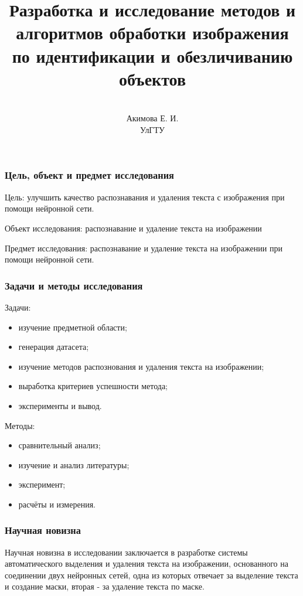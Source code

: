 \documentclass[
	fullscreen=true, 
	bookmarks=false,
	sans serif,
	9pt,
	pdf,
	hyperref={
		pdfpagelabels=false,
		unicode=true
	}
]{beamer}
\title{
	Разработка и исследование методов и алгоритмов обработки изображения по идентификации и обезличиванию объектов
}
\author{
	\vspace{0.5cm}\\
	\large
    Акимова Е. И.\\
	\vspace{0.1cm}
	УлГТУ\\
	\vspace{2cm}
}
\institute{}
\begin{document}
	
	\begin{frame}
		\titlepage
	\end{frame}	
		
	\section{}
	\subsection{}
		
	\begin{frame}\frametitle{Цель, объект и предмет исследования}
		Цель: улучшить качество распознавания и удаления текста с изображения при помощи нейронной сети.
		\newline
		
		Объект исследования: распознавание и удаление текста на изображении
		\newline
		
		Предмет исследования: распознавание и удаление текста на изображении при помощи нейронной сети.
	\end{frame}

	\begin{frame}\frametitle{Задачи и методы исследования}
		Задачи:
		\begin{itemize}
			\item изучение предметной области;
			\item генерация датасета;
			\item изучение методов распознования и удаления текста на изображении;
			\item выработка критериев успешности метода;
			\item эксперименты и вывод.
		\end{itemize}
		Методы:
		\begin{itemize}
			\item сравнительный анализ;
			\item изучение и анализ литературы;
			\item эксперимент;
			\item расчёты и измерения.
		\end{itemize}
	\end{frame}

	\begin{frame}\frametitle{Научная новизна}
		Научная новизна в исследовании заключается в разработке системы автоматического выделения и удаления текста на изображении, основанного на соединении двух нейронных сетей, одна из которых отвечает за выделение текста и создание маски, вторая - за удаление текста по маске.
	\end{frame}
\end{document}
